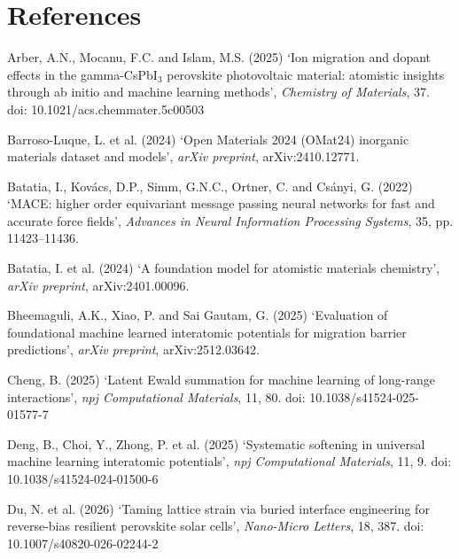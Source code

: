 \documentclass[11pt,a4paper]{article}
\begin{document}
\section*{References}
\begin{list}{}{\setlength{\itemindent}{-1.2em}\setlength{\leftmargin}{1.2em}\setlength{\itemsep}{0.25em}\small}

\item Arber, A.N., Mocanu, F.C. and Islam, M.S. (2025) `Ion migration and dopant
effects in the gamma-CsPbI$_3$ perovskite photovoltaic material: atomistic insights
through ab initio and machine learning methods', \emph{Chemistry of Materials}, 37.
doi: 10.1021/acs.chemmater.5c00503

\item Barroso-Luque, L. et al. (2024) `Open Materials 2024 (OMat24) inorganic
materials dataset and models', \emph{arXiv preprint}, arXiv:2410.12771.

\item Batatia, I., Kov\'acs, D.P., Simm, G.N.C., Ortner, C. and Cs\'anyi, G. (2022)
`MACE: higher order equivariant message passing neural networks for fast and accurate
force fields', \emph{Advances in Neural Information Processing Systems}, 35,
pp. 11423--11436.

\item Batatia, I. et al. (2024) `A foundation model for atomistic materials
chemistry', \emph{arXiv preprint}, arXiv:2401.00096.

\item Bheemaguli, A.K., Xiao, P. and Sai Gautam, G. (2025) `Evaluation of foundational
machine learned interatomic potentials for migration barrier predictions',
\emph{arXiv preprint}, arXiv:2512.03642.

\item Cheng, B. (2025) `Latent Ewald summation for machine learning of long-range
interactions', \emph{npj Computational Materials}, 11, 80. doi:
10.1038/s41524-025-01577-7

\item Deng, B., Choi, Y., Zhong, P. et al. (2025) `Systematic softening in universal
machine learning interatomic potentials', \emph{npj Computational Materials}, 11, 9.
doi: 10.1038/s41524-024-01500-6

\item Du, N. et al. (2026) `Taming lattice strain via buried interface engineering for
reverse-bias resilient perovskite solar cells', \emph{Nano-Micro Letters}, 18, 387.
doi: 10.1007/s40820-026-02244-2


\end{list}
\end{document}
